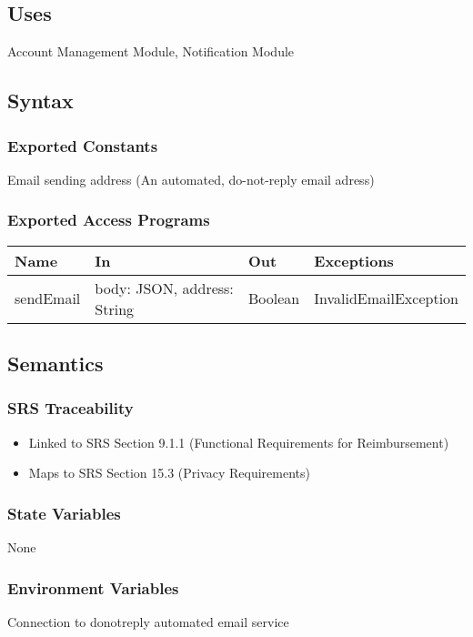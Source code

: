 \documentclass[12pt, titlepage]{article}
\begin{document}
\subsection{Uses}
Account Management Module, Notification Module

\subsection{Syntax}

\subsubsection{Exported Constants}
Email sending address (An automated, do-not-reply email adress)
\subsubsection{Exported Access Programs}

\begin{center}
\begin{tabular}{p{2cm} p{4cm} p{2cm} p{4cm}}
\hline
\textbf{Name} & \textbf{In} & \textbf{Out} & \textbf{Exceptions} \\
\hline
sendEmail & body: JSON, address: String & Boolean & InvalidEmailException \\
\hline
\end{tabular}
\end{center}

\subsection{Semantics}

\subsubsection{SRS Traceability}
\begin{itemize}
  \item Linked to SRS Section 9.1.1 (Functional Requirements for Reimbursement)
  \item Maps to SRS Section 15.3 (Privacy Requirements)
\end{itemize}

\subsubsection{State Variables}
None

\subsubsection{Environment Variables}
Connection to donotreply automated email service
\end{document}

